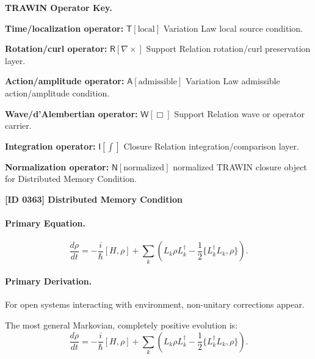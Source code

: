 \par\vspace{0.45\baselineskip}
\noindent\begin{minipage}[t]{\linewidth}
\begingroup
\small
\raggedright
\textbf{TRAWIN Operator Key.}\par
\noindent\textbf{Time/localization operator:} $\mathsf{T}\!\left[\mathrm{local}\right]$ Variation Law local source condition.\par
\noindent\textbf{Rotation/curl operator:} $\mathsf{R}\!\left[\nabla\times\right]$ Support Relation rotation/curl preservation layer.\par
\noindent\textbf{Action/amplitude operator:} $\mathsf{A}\!\left[\mathrm{admissible}\right]$ Variation Law admissible action/amplitude condition.\par
\noindent\textbf{Wave/d'Alembertian operator:} $\mathsf{W}\!\left[\Box\right]$ Support Relation wave or operator carrier.\par
\noindent\textbf{Integration operator:} $\mathsf{I}\!\left[\int\right]$ Closure Relation integration/comparison layer.\par
\noindent\textbf{Normalization operator:} $\mathsf{N}\!\left[\mathrm{normalized}\right]$ normalized TRAWIN closure object for Distributed Memory Condition.\par
\endgroup
\end{minipage}

\clearpage
\noindent\textbf{[ID 0363] Distributed Memory Condition}\par
\vspace{0.35em}
\paragraph{Primary Equation.}
\begin{equation}
\frac{d\rho}{dt}
=
-\frac{i}{\hbar}[H,\rho]
+
\sum_k
\left(
L_k \rho L_k^\dagger
-
\frac{1}{2}
\{L_k^\dagger L_k,\rho\}
\right).
\end{equation}

\paragraph{Primary Derivation.}
For open systems interacting with environment, non-unitary corrections appear.

The most general Markovian, completely positive evolution is:
\begin{equation}
\boxed{
\frac{d\rho}{dt}
=
-\frac{i}{\hbar}[H,\rho]
+
\sum_k
\left(
L_k \rho L_k^\dagger
-
\frac{1}{2}
\{L_k^\dagger L_k,\rho\}
\right).
}
\end{equation}

